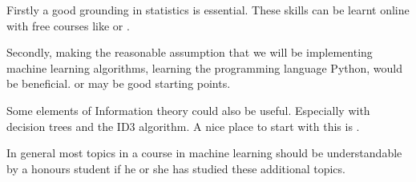 \documentclass[10pt,a4paper]{article}
\begin{document}
Firstly a good grounding in statistics is essential. These skills can be learnt online with free courses like \cite{udacitystat} or \cite{edxstat}.

Secondly, making the reasonable assumption that we will be implementing machine learning algorithms, learning the programming language Python, would be beneficial. \cite{python} or \cite{python2} may be good starting points.

Some elements of Information theory could also be useful. Especially with decision trees and the ID3 algorithm. A nice place to start with this is \cite{wikistat}.

In general most topics in a course in machine learning should be understandable by a honours student if he or she has studied these additional topics.

\end{document}
